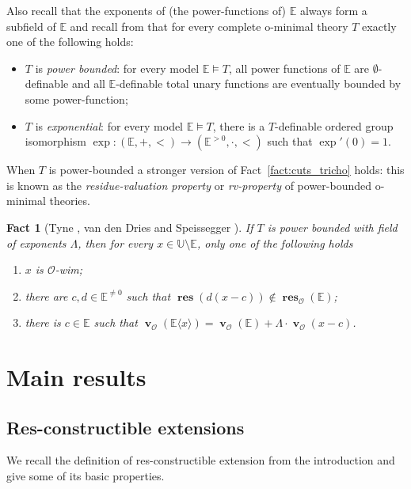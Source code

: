 \documentclass{amsart}
\newtheorem{fact}[theorem]{Fact}
\theoremstyle{remark}
\theoremstyle{definition}
\theoremstyle{plain}
\newcommand{\bE}{\mathbb E}
\newcommand{\bU}{\mathbb U}
\newcommand{\cO}{\mathcal O}
\DeclareMathOperator{\val}{\mathbf{v}}
\DeclareMathOperator{\res}{\mathbf{res}}
\theoremstyle{plain}
\begin{document}
Also recall that the exponents of (the power-functions of) $\bE$ always form a subfield of $\bE$ and recall from \cite[Thm.~3.6]{miller1993growth} that for every complete o-minimal theory $T$ exactly one of the following holds:
\begin{itemize}
    \item $T$ is \emph{power bounded}: for every model $\bE\models T$, all power functions of $\bE$ are $\emptyset$-definable and all $\bE$-definable total unary functions are eventually bounded by some power-function;
    \item $T$ is \emph{exponential}: for every model $\bE \models T$, there is a $T$-definable ordered group isomorphism $\exp: (\bE, +, <)\to (\bE^{>0}, \cdot, <)$ such that $\exp'(0)=1$.
\end{itemize}

When $T$ is power-bounded a stronger version of Fact~\ref{fact:cuts_tricho} holds: this is known as the \emph{residue-valuation property} or \emph{rv-property} of power-bounded o-minimal theories.

\begin{fact}[{Tyne \cite[Thms.~12.10 and 13.4]{tyne2003t}, van den Dries and Speissegger \cite[9.2 and 10.1]{dries2000field}}]\label{fact:rv-property}
    If $T$ is power bounded with field of exponents $\Lambda$, then for every $x \in \bU \setminus \bE$, only one of the following holds
    \begin{enumerate}
        \item $x$ is $\cO$-wim;
        \item there are $c,d \in \bE^{\neq 0}$ such that $\res(d(x-c)) \notin \res_\cO(\bE)$;
        \item there is $c \in \bE$ such that $\val_\cO(\bE \langle x \rangle) = \val_\cO(\bE) + \Lambda \cdot \val_\cO(x-c)$.
    \end{enumerate}
\end{fact}

\section{Main results}

\subsection{Res-constructible extensions}
We recall the definition of res-constructible extension from the introduction and give some of its basic properties.
\end{document}
